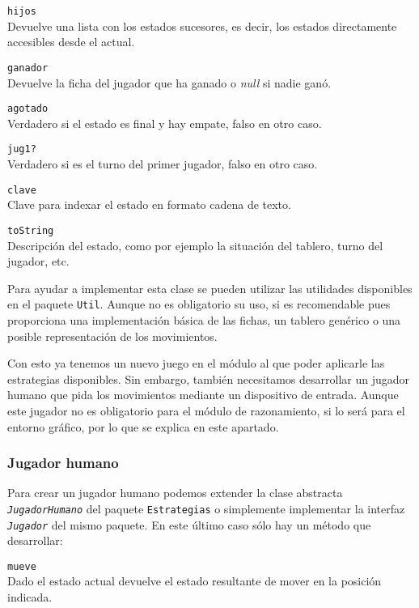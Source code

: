 \bigskip
\begin{description}
	\item \texttt{hijos} \\
	Devuelve una lista con los estados sucesores, es decir, los estados directamente accesibles desde el actual.
	\item \texttt{ganador} \\
	Devuelve la ficha del jugador que ha ganado o \textit{null} si nadie ganó.
	\item \texttt{agotado} \\
	Verdadero si el estado es final y hay empate, falso en otro caso.
	\item \texttt{jug1?} \\
	Verdadero si es el turno del primer jugador, falso en otro caso.
	\item \texttt{clave} \\	
	Clave para indexar el estado en formato cadena de texto.
	\item \texttt{toString} \\
	Descripción del estado, como por ejemplo la situación del tablero, turno del jugador, etc.
\end{description}

Para ayudar a implementar esta clase se pueden utilizar las utilidades disponibles en el paquete \texttt{Util}.
Aunque no es obligatorio su uso, si es recomendable pues proporciona una implementación básica de las fichas, un tablero genérico o una posible representación de los movimientos.

Con esto ya tenemos un nuevo juego en el módulo al que poder aplicarle las estrategias disponibles.
Sin embargo, también necesitamos desarrollar un jugador humano que pida los movimientos mediante un dispositivo de entrada. 
Aunque este jugador no es obligatorio para el módulo de razonamiento, si lo será para el entorno gráfico, por lo que se explica en este apartado.

\subsubsection{Jugador humano}
\label{sssec:desarrollo_jugador_humano}
Para crear un jugador humano podemos extender la clase abstracta \texttt{\textit{JugadorHumano}} del paquete \texttt{Estrategias} o simplemente implementar la interfaz \texttt{\textit{Jugador}} del mismo paquete. En este último caso sólo hay un método que desarrollar:

\begin{description}
	\item \texttt{mueve} \\
	Dado el estado actual devuelve el estado resultante de mover en la posición indicada.
\end{description}

